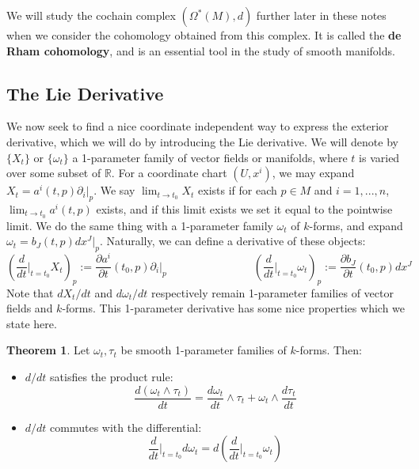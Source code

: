 \documentclass[11pt, oneside]{article}   	%
\theoremstyle{definition}
\newtheorem{theorem}{Theorem}[section]
\begin{document}
We will study the cochain complex $(\Omega^*(M), d)$ further later in these notes when we consider the cohomology obtained 
from this complex. It is called the \textbf{de Rham cohomology}, and is an essential tool in the study of smooth manifolds. 

\subsection{The Lie Derivative}

We now seek to find a nice coordinate independent way to express the exterior derivative, which we will do by introducing 
the Lie derivative. We will denote by $\{X_t\}$ or $\{\omega_t\}$ a 1-parameter family of vector fields or manifolds, where 
$t$ is varied over some subset of $\mathbb R$. For a coordinate chart $(U, x^i)$, we may expand $X_t = a^i(t, p)\partial_i|_p$. 
We say $\lim_{t\rightarrow t_0}X_t$ exists if for each $p\in M$ and $i = 1, ..., n$, $\lim_{t\rightarrow t_0} a^i(t, p)$ exists, and 
if this limit exists we set it equal to the pointwise limit. We do the same thing with a 1-parameter family $\omega_t$ of 
$k$-forms, and expand $\omega_t = b_J(t, p) dx^J|_p$. Naturally, we can define a derivative of these objects:
\begin{equation}
	\left(\frac{d}{dt}\bigg|_{t = t_0} X_t\right)_p := \frac{\partial a^i}{\partial t}(t_0, p)\partial_i|_p
	\;\;\;\;\;\;\;\;\;\;\;\;\;\;\;\;\;\;\;\;\;\;\;\;\;\;\;\;
	\left(\frac{d}{dt}\bigg|_{t = t_0} \omega_t\right)_p := \frac{\partial b_J}{\partial t}(t_0, p)dx^J
\end{equation}
Note that $dX_t / dt$ and $d\omega_t / dt$ respectively remain 1-parameter families of vector fields and $k$-forms. This 
1-parameter derivative has some nice properties which we state here.
\begin{theorem}
	Let $\omega_t, \tau_t$ be smooth 1-parameter families of $k$-forms. Then:
	\begin{itemize}
		\item $d / dt$ satisfies the product rule:
		\begin{equation}
			\frac{d(\omega_t\wedge\tau_t)}{dt} = \frac{d\omega_t}{dt}\wedge\tau_t + \omega_t\wedge\frac{d\tau_t}{dt}
		\end{equation}
		\item $d / dt$ commutes with the differential:
		\begin{equation}
			\frac{d}{dt}\bigg|_{t = t_0} d\omega_t = d\left(\frac{d}{dt}\bigg|_{t = t_0}\omega_t\right)
		\end{equation}
	\end{itemize}
\end{theorem}
\end{document}
